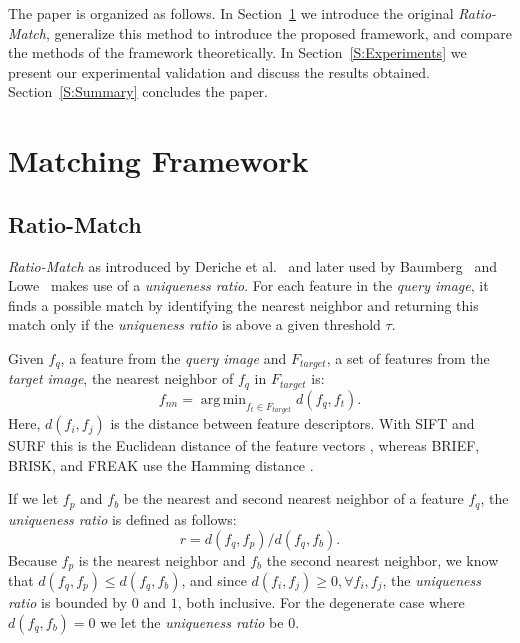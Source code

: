 \documentclass[10pt,journal,cspaper,compsoc]{IEEEtran}
\DeclareMathOperator*{\argmin}{arg\,min}
\begin{document}
The paper is organized as follows. In Section~\ref{S:MatchingMethods} we 
introduce the original \emph{Ratio-Match}, generalize this method to 
introduce the proposed framework, and compare the methods of the 
framework theoretically.  In Section~\ref{S:Experiments} we present 
our experimental validation and discuss the results obtained.  Section~\ref{S:Summary} 
concludes the paper.

\section{Matching Framework}
\label{S:MatchingMethods}
%
\subsection{Ratio-Match}
%
\emph{Ratio-Match} as introduced by Deriche et al.\ 
\cite{deriche1994robust} and later used by 
Baumberg~\cite{baumberg2000reliable} and Lowe~\cite{lowe2004sift} makes 
use of a \emph{uniqueness ratio}. For each feature in the \emph{query 
image}, it finds a possible match by identifying the nearest neighbor and 
returning this match only if the \emph{uniqueness ratio} is above a 
given threshold $\tau$. 

Given $f_q$, a feature from the \emph{query 
image} and $F_{target}$, a set of features from the \emph{target image}, 
the nearest neighbor of $f_q$ in $F_{target}$ is:
\begin{equation*}
    f_{nn} = \argmin_{f_t \in F_{target}} d(f_q, f_t).
\end{equation*}
Here, $d(f_i, f_j)$ is the distance between feature descriptors.  
With SIFT and SURF this is the Euclidean distance of the feature vectors
\cite{lowe2004sift,bay2006surf}, whereas BRIEF, BRISK, and FREAK 
use the Hamming distance \cite{leutenegger2011brisk,calonder2010brief,alahi2012freak}.  

If we let $f_p$ and $f_b$ be the nearest and second nearest neighbor of a feature $f_q$, 
the \emph{uniqueness ratio} is defined as follows:
\begin{equation*}
    r = d(f_q, f_p) / d(f_q, f_b).
\end{equation*}
Because $f_p$ is the nearest neighbor and $f_b$ the second nearest 
neighbor, we know that $d(f_q, f_p) \leq d(f_q, f_b)$, and since $d(f_i, 
f_j) \geq 0, \forall f_i,f_j$, the \emph{uniqueness ratio} is bounded by $0$ 
and $1$, both inclusive. For the degenerate case where $d(f_q, f_b) = 0$
we let the \emph{uniqueness ratio} be $0$.
\end{document}
